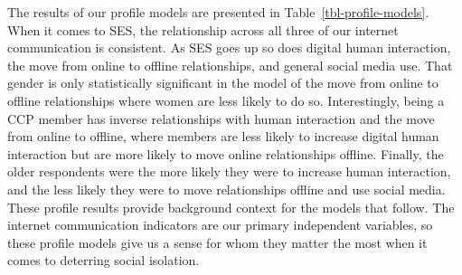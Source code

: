 \documentclass[
  letterpaper,
  DIV=11,
  numbers=noendperiod]{scrartcl}
\begin{document}
The results of our profile models are presented in
Table~\ref{tbl-profile-models}. When it comes to SES, the relationship
across all three of our internet communication is consistent. As SES
goes up so does digital human interaction, the move from online to
offline relationships, and general social media use. That gender is only
statistically significant in the model of the move from online to
offline relationships where women are less likely to do so.
Interestingly, being a CCP member has inverse relationships with human
interaction and the move from online to offline, where members are less
likely to increase digital human interaction but are more likely to move
online relationships offline. Finally, the older respondents were the
more likely they were to increase human interaction, and the less likely
they were to move relationships offline and use social media. These
profile results provide background context for the models that follow.
The internet communication indicators are our primary independent
variables, so these profile models give us a sense for whom they matter
the most when it comes to deterring social isolation.
\end{document}
